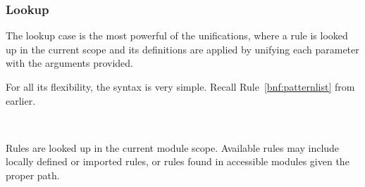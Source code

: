 \subsubsection{Lookup}

The lookup case is the most powerful of the unifications, where a rule is looked up
in the current scope and its definitions are applied by unifying each parameter with
the arguments provided.

For all its flexibility, the syntax is very simple. Recall Rule~\ref{bnf:patternlist}
from earlier.

\begin{bnf*}
     \\
\end{bnf*}

Rules are looked up in the current module scope. Available rules may include locally
defined or imported rules, or rules found in accessible modules given the proper path.

\begin{prooftree}
\end{prooftree}
